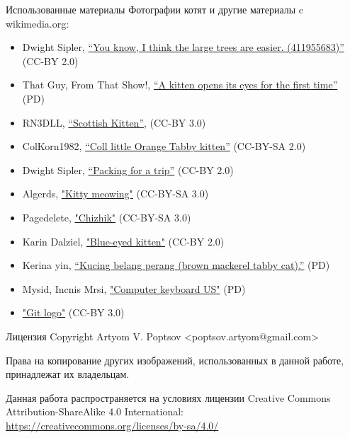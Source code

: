 \documentclass[presentation]{beamer}
\begin{document}
\begin{frame}{Использованные материалы}
  Фотографии котят и другие материалы c wikimedia.org:
  \begin{itemize}
  \item Dwight Sipler,
    \href{https://www.flickr.com/photos/photofarmer/411955683/}{``You
      know, I think the large trees are easier. (411955683)''} (CC-BY
    2.0)
  \item That Guy, From That Show!,
    \href{https://commons.wikimedia.org/wiki/File:Youngkitten.JPG}{``A
      kitten opens its eyes for the first time''} (PD)
  \item RN3DLL,
    \href{https://commons.wikimedia.org/wiki/File:Scottish_Kitten.png}{``Scottish
      Kitten''}, (CC-BY 3.0)
  \item ColKorn1982,
    \href{https://commons.wikimedia.org/wiki/File:Scurred.jpg}{``Coll
      little Orange Tabby kitten''} (CC-BY-SA 2.0)
  \item Dwight Sipler,
    \href{https://commons.wikimedia.org/wiki/File:Packing_for_a_trip_(302328043).jpg}{``Packing
      for a trip''} (CC-BY 2.0)
  \item Algerds,
    \href{https://commons.wikimedia.org/wiki/File:Kitty_meowing.jpg}{"Kitty
      meowing"} (CC-BY-SA 3.0)
  \item Pagedelete,
    \href{https://commons.wikimedia.org/wiki/File:Chizhik.jpg}{"Chizhik"}
    (CC-BY-SA 3.0)
  \item Karin Dalziel,
    \href{https://commons.wikimedia.org/wiki/File:Blue-eyed_kitten.jpg}{"Blue-eyed
      kitten"} (CC-BY 2.0)
  \item Kerina yin,
    \href{https://commons.wikimedia.org/wiki/File:Kucing_belang_perang_(brown_mackerel_tabby_cat).JPG}{``Kucing
      belang perang (brown mackerel tabby cat).''} (PD)
  \item Mysid, Incnis Mrsi,
    \href{https://commons.wikimedia.org/wiki/File:Computer_keyboard_US.svg}{"Computer
      keyboard US"} (PD)
  \item
    \href{https://commons.wikimedia.org/wiki/File:Git-logo.svg}{"Git
      logo"} (CC-BY 3.0)
  \end{itemize}

  \bigskip
\end{frame}

\begin{frame}{Лицензия}
  Copyright  Artyom V. Poptsov
  <poptsov.artyom@gmail.com> \newline

  Права на копирование других изображений, использованных в данной
  работе, принадлежат их владельцам. \newline

  Данная работа распространяется на условиях лицензии Creative Commons
  Attribution-ShareAlike 4.0 International:
  \url{https://creativecommons.org/licenses/by-sa/4.0/}
\end{frame}
\end{document}
